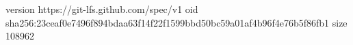 version https://git-lfs.github.com/spec/v1
oid sha256:23ceaf0e7496f894bdaa63f14f22f1599bbd50bc59a01af4b96f4e76b5f86fb1
size 108962
